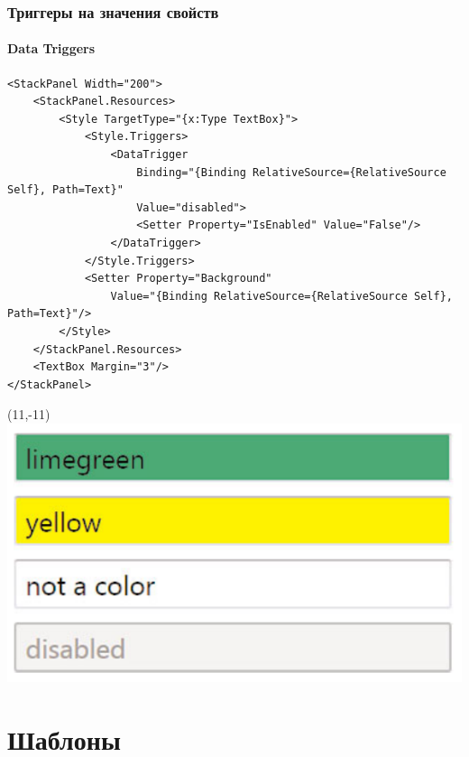 \documentclass[xetex,mathserif,serif]{beamer}
\begin{document}
	\begin{frame}[fragile]
		\frametitle{Триггеры на значения свойств}
		\framesubtitle{Data Triggers}
		\begin{scriptsize}
			\begin{verbatim}
<StackPanel Width="200">
    <StackPanel.Resources>
        <Style TargetType="{x:Type TextBox}">
            <Style.Triggers>
                <DataTrigger
                    Binding="{Binding RelativeSource={RelativeSource Self}, Path=Text}"
                    Value="disabled">
                    <Setter Property="IsEnabled" Value="False"/>
                </DataTrigger>
            </Style.Triggers>
            <Setter Property="Background"
                Value="{Binding RelativeSource={RelativeSource Self}, Path=Text}"/>
        </Style>
    </StackPanel.Resources>
    <TextBox Margin="3"/>
</StackPanel>
			\end{verbatim}
		\end{scriptsize}
		\begin{textblock}{4}(11,-11)
			\includegraphics[width=\textwidth]{triggeredTextBoxes.png}
		\end{textblock}
	\end{frame}

	\section{Шаблоны}
\end{document}
